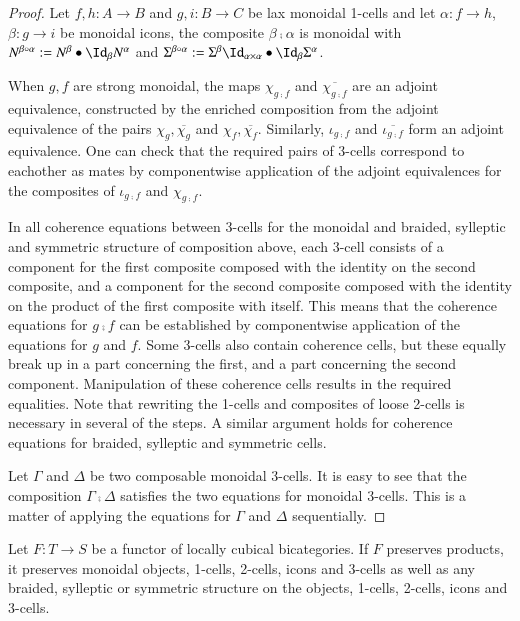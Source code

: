 \begin{proof}
Let $f,h: A \rightarrow B $ and $g,i: B \rightarrow C$ be lax monoidal 1-cells and let $\alpha: f \rightarrow h$, $\beta: g \rightarrow i$ be monoidal icons, the composite $\beta \comp \alpha$ is monoidal with $N^{\beta \comp \alpha}:= N^{\beta} \horc \looseid_{\beta} N^{\alpha}$ and $\Sigma^{\beta \comp \alpha}:= \Sigma^{\beta}\looseid_{\alpha \times \alpha} \horc \looseid_{\beta} \Sigma^{\alpha}$.

When $g,f$ are strong monoidal, the maps $\chi_{g \comp f}$ and $\overline{\chi_{g \comp f}}$ are an adjoint equivalence, constructed by the enriched composition from the adjoint equivalence of the pairs $\chi_g, \overline{\chi_g}$ and $\chi_f, \overline{\chi_f}$. Similarly, $\iota_{g \comp f}$ and $\overline{\iota_{g \comp f}}$ form an adjoint equivalence. One can check that the required pairs of 3-cells correspond to eachother as mates by componentwise application of the adjoint equivalences for the composites of $\iota_{g \comp f}$ and $\chi_{g \comp f}$.

In all coherence equations between 3-cells for the monoidal and braided, sylleptic and symmetric structure of composition above, each 3-cell consists of a component for the first composite  composed with the identity on the second composite, and a component for the second composite composed with the identity on the product of the first composite with itself. This means that the coherence equations for $g \comp f$  can be established by componentwise application of the equations for $g$ and $f$. Some 3-cells also contain coherence cells, but these equally break up in a part concerning the first, and a part concerning the second component. Manipulation of these coherence cells results in the required equalities. Note that rewriting the 1-cells and composites of loose 2-cells is necessary in several of the steps. A similar argument holds for coherence equations for braided, sylleptic and symmetric cells.

Let $\Gamma$ and $\Delta$ be two composable monoidal 3-cells. It is easy to see that the composition $\Gamma \comp \Delta$ satisfies the two equations for monoidal 3-cells. This is a matter of applying the equations for $\Gamma$ and $\Delta$ sequentially.
\end{proof}

 \begin{lem}\label{lem:funcmonob}
Let $F: T \rightarrow S$ be a functor of locally cubical bicategories. If $F$ preserves products, it preserves  monoidal objects, 1-cells, 2-cells, icons and 3-cells as well as any braided, sylleptic or symmetric structure on the objects, 1-cells, 2-cells, icons and 3-cells.
 \end{lem}
 
